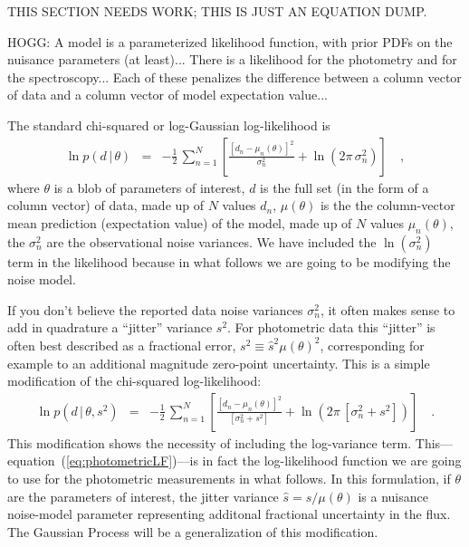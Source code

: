 \documentclass[iop,numberedappendix]{emulateapj}
\newcommand{\given}{\,|\,}
\begin{document}
THIS SECTION NEEDS WORK; THIS IS JUST AN EQUATION DUMP.

HOGG: A model is a parameterized likelihood function, with prior PDFs on the nuisance parameters (at least)...
There is a likelihood for the photometry and for the spectroscopy...
Each of these penalizes the difference between a column vector of data and a column vector of model expectation value...

The standard chi-squared or log-Gaussian log-likelihood is
\begin{eqnarray}
\ln p(d\given\theta) &=& -\frac{1}{2}\,\sum_{n=1}^N \left[\frac{[d_n - \mu_n(\theta)]^2}{\sigma_n^2} + \ln(2\pi\,\sigma_n^2) \right]
\quad ,
\end{eqnarray}
where $\theta$ is a blob of parameters of interest,
$d$ is the full set (in the form of a column vector) of data,
made up of $N$ values $d_n$,
$\mu(\theta)$ is the the column-vector mean prediction (expectation value) of the model,
made up of $N$ values $\mu_n(\theta)$,
the $\sigma_n^2$ are the observational noise variances.
We have included the $\ln(\sigma_n^2)$ term in the likelihood because
in what follows we are going to be modifying the noise model.

If you don't believe the reported data noise variances $\sigma_n^2$,
it often makes sense to add in quadrature a ``jitter'' variance $s^2$.
For photometric data this ``jitter'' is often best described as a
fractional error, $s^2 \equiv \hat{s}^2\mu(\theta)^2$, corresponding
for example to an additional magnitude zero-point uncertainty.  This
is a simple modification of the chi-squared log-likelihood:
\begin{eqnarray}\label{eq:photometricLF}
\ln p(d\given\theta,s^2) &=& -\frac{1}{2}\,\sum_{n=1}^N
                             \left[\frac{[d_n - \mu_n(\theta)]^2}
                             {[\sigma_n^2 + s^2]} + 
                             \ln(2\pi\,[\sigma_n^2 + s^2]) \right]
\quad .
\end{eqnarray}
This modification shows the necessity of including the log-variance
term.
This---equation~(\ref{eq:photometricLF})---is in fact the
log-likelihood function we are going to use for the photometric
measurements in what follows.  In this formulation, if $\theta$ are
the parameters of interest, the jitter variance $\hat{s} = 
s/\mu(\theta)$ is a nuisance noise-model parameter representing
additonal fractional uncertainty in the flux.  The Gaussian Process
will be a generalization of this modification.
\end{document}
